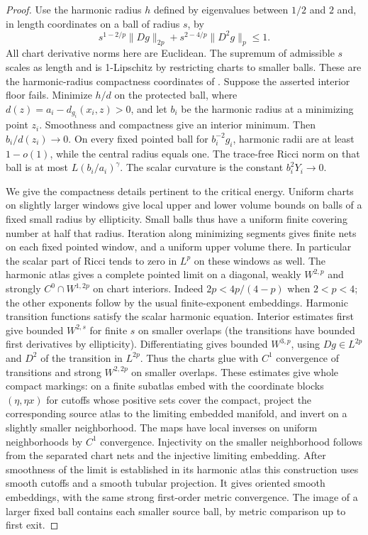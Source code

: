 \begin{proof}
Use the harmonic radius \(h\) defined by eigenvalues between \(1/2\)
and \(2\) and, in length coordinates on a ball of radius \(s\), by
\[
 s^{1-2/p}\|Dg\|_{2p}+s^{2-4/p}\|D^2g\|_p\le1 .
\]
All chart derivative norms here are Euclidean. The supremum of
admissible \(s\) scales as length and is 1-Lipschitz by restricting
charts to smaller balls. These are the harmonic-radius compactness
coordinates of \cite[\S2]{AndersonCheegerGromovAuthorSurvey}.
Suppose the asserted interior floor fails. Minimize \(h/d\) on the
protected ball, where \(d(z)=a_i-d_{g_i}(x_i,z)>0\), and let \(b_i\)
be the harmonic radius at a minimizing point \(z_i\). Smoothness and
compactness give an interior minimum. Then \(b_i/d(z_i)\to0\).
On every fixed pointed ball for \(b_i^{-2}g_i\), harmonic radii are
at least \(1-o(1)\), while the central radius equals one. The
trace-free Ricci norm on that ball is at most
\(L(b_i/a_i)^\gamma\). The scalar curvature is the constant
\(b_i^2Y_i\to0\).

We give the compactness details pertinent to the critical energy.
Uniform charts on slightly larger windows give local upper and lower
volume bounds on balls of a fixed small radius by ellipticity.
Small balls thus have a uniform finite covering number at half that
radius. Iteration along minimizing segments gives finite nets on each
fixed pointed window, and a uniform upper volume there. In particular
the scalar part of Ricci tends to zero in \(L^p\) on these windows
as well. The harmonic atlas gives a complete pointed limit on a
diagonal, weakly \(W^{2,p}\) and strongly \(C^0\cap W^{1,2p}\)
on chart interiors. Indeed \(2p<4p/(4-p)\) when \(2<p<4\);
the other exponents follow by the usual finite-exponent embeddings.
Harmonic transition functions satisfy the scalar harmonic equation.
Interior estimates first give bounded \(W^{2,s}\) for finite \(s\)
on smaller overlaps (the transitions have bounded first derivatives
by ellipticity). Differentiating gives bounded \(W^{3,p}\), using
\(Dg\in L^{2p}\) and \(D^2\) of the transition in \(L^{2p}\).
Thus the charts glue with \(C^1\) convergence of transitions and
strong \(W^{2,2p}\) on smaller overlaps. These estimates give
whole compact markings: on a finite subatlas embed with the coordinate
blocks \((\eta,\eta x)\) for cutoffs whose positive sets cover the
compact, project the corresponding source atlas to the limiting
embedded manifold, and invert on a slightly smaller neighborhood.
The maps have local inverses on uniform neighborhoods by \(C^1\)
convergence. Injectivity on the smaller neighborhood follows from
the separated chart nets and the injective limiting embedding.
After smoothness of the limit is established in its harmonic atlas
this construction uses smooth cutoffs and a smooth tubular projection.
It gives oriented smooth embeddings, with the same strong first-order
metric convergence. The image of a larger fixed ball contains each
smaller source ball, by metric comparison up to first exit.


\end{proof}

